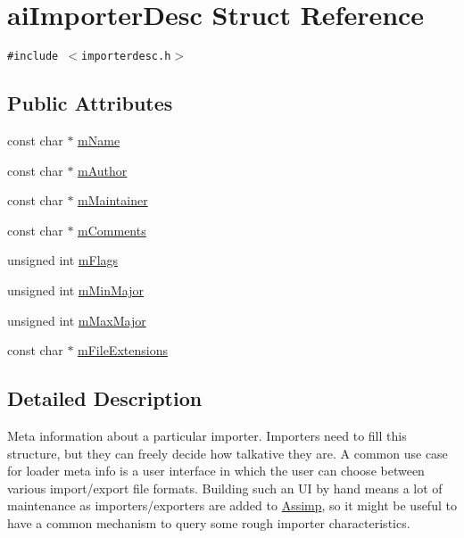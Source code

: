 \hypertarget{structai_importer_desc}{
\section{aiImporterDesc Struct Reference}
\label{structai_importer_desc}
}
{\tt \#include $<$importerdesc.h$>$}

\subsection*{Public Attributes}
\begin{CompactItemize}
\item 
const char $\ast$ \hyperlink{structai_importer_desc_2a9d5fd818c01bba1a0a782722ab9495}{mName}
\item 
const char $\ast$ \hyperlink{structai_importer_desc_8e050453324b1e855701c7c082c1b24b}{mAuthor}
\item 
const char $\ast$ \hyperlink{structai_importer_desc_53bf0ecb36ce0b97018b4b6bd2748f02}{mMaintainer}
\item 
const char $\ast$ \hyperlink{structai_importer_desc_2d8ad562f6c18ee9e8bfdb2da4871118}{mComments}
\item 
unsigned int \hyperlink{structai_importer_desc_9939db58b9f95a537f9f5a749524b6b2}{mFlags}
\item 
unsigned int \hyperlink{structai_importer_desc_ee34d348f522807f0a36607664e92a57}{mMinMajor}
\item 
unsigned int \hyperlink{structai_importer_desc_9d33eac3be20f7f4630f838a228ada63}{mMaxMajor}
\item 
const char $\ast$ \hyperlink{structai_importer_desc_074bd688ffd15d7f4df32e794111a413}{mFileExtensions}
\end{CompactItemize}


\subsection{Detailed Description}
Meta information about a particular importer. Importers need to fill this structure, but they can freely decide how talkative they are. A common use case for loader meta info is a user interface in which the user can choose between various import/export file formats. Building such an UI by hand means a lot of maintenance as importers/exporters are added to \hyperlink{namespace_assimp}{Assimp}, so it might be useful to have a common mechanism to query some rough importer characteristics. 

